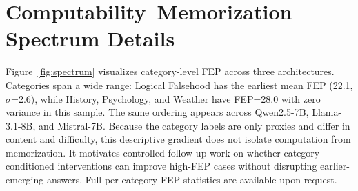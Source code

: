 \documentclass[11pt]{article}
\begin{document}
\begin{table}[htbp]
\centering\small
{}
\caption{Cross-benchmark FEP validation (Qwen2.5-7B). Late Crystallization is even more pronounced on MMLU (98.2\%) than TruthfulQA (85.9\%), and consistent across all MMLU subject groups (97.2--99.1\%).}
\label{tab:mmlu_fep}
\end{table}

\section{Computability--Memorization Spectrum Details}
\label{app:spectrum}

Figure~\ref{fig:spectrum} visualizes category-level FEP across three architectures. Categories span a wide range: Logical Falsehood has the earliest mean FEP (22.1, $\sigma$=2.6), while History, Psychology, and Weather have FEP=28.0 with zero variance in this sample. The same ordering appears across Qwen2.5-7B, Llama-3.1-8B, and Mistral-7B. Because the category labels are only proxies and differ in content and difficulty, this descriptive gradient does not isolate computation from memorization. It motivates controlled follow-up work on whether category-conditioned interventions can improve high-FEP cases without disrupting earlier-emerging answers. Full per-category FEP statistics are available upon request.
\end{document}
